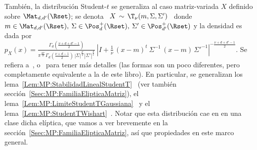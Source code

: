 Tambi\'en, la  distribuci\'on Student-$t$  se generaliza al  caso matriz-variada
$X$  definido   sobre  $\Mat_{d,d'}(\Rset)$;   se  denota  \   $X  \,   \sim  \,
\T_\nu(m,\Sigma,\Sigma')$  \ donde \  $m \in  \Mat_{d,d'}(\Rset), \:  \Sigma \in
\Pos_d^+(\Rset), \:  \Sigma' \in \Pos_{d'}^+(\Rset)$  y la densidad es  dada por
$\displaystyle             p_X(x)             =             \frac{\Gamma_d\left(
    \frac{\nu+d+d'-1}{2}\right)}{\pi^{\frac{d       d'}{2}}       \Gamma_d\left(
    \frac{\nu+d-1}{2}\right)  \,  \left|  \Sigma  \right|^{\frac{d'}{2}}  \left|
    \Sigma'  \right|^{\frac{d}{2}}} \:  \left| I  + \frac{1}{\nu}  \,  (x-m)^t \
  \Sigma^{-1}  \, (x-m) \,  \Sigma'^{-1} \right|^{-  \frac{\nu+d+d'-1}{2}}$.  Se
refiera a~\cite{Dic67}, \cite[Cap.~4]{GupNag99} o~\cite[\S5.11 y ref.]{KotNag04}
para tener m\'as detalles (las formas son un poco diferentes, pero completamente
equivalente  a   la  de  este   libro).   En  particular,  se   generalizan  los
lema~\ref{Lem:MP:StabilidadLinealStudentT}~\cite[Teo.~4.3.5]{GupNag99}       (ver
tambi\'en           secci\'on~\ref{Ssec:MP:FamiliaElipticaMatriz}),           el
lema~\ref{Lem:MP:LimiteStudentTGaussiana}~\cite[Teo.~4.3.4]{GupNag99}    y    el
lema~\ref{Lem:MP:StudentTWishart}~\cite[Teo.~4.2.1]{GupNag99}.  Notar  que  esta
distribuci\'on cae en en una clase  dicha el\'iptica, que vamos a ver brevemente
en  la secci\'on~\ref{Ssec:MP:FamiliaElipticaMatriz},  as\'i que  propiedades en
este marco general.
